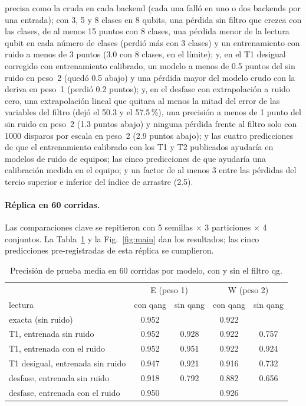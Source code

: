 \documentclass[11pt]{article}
\begin{document}
\begin{itemize}
  precisa como la cruda en cada backend (cada una falló en uno o dos backends por una entrada); con 3, 5 y 8 clases
  en 8 qubits, una pérdida sin filtro que crezca con las clases, de al menos 15 puntos con 8 clases, una pérdida
  menor de la lectura qubit en cada número de clases (perdió más con 3 clases) y un entrenamiento con ruido a menos
  de 3 puntos (3.0 con 8 clases, en el límite); y, en el T1 desigual corregido con entrenamiento calibrado, un modelo
  a menos de 0.5 puntos del sin ruido en peso~2 (quedó 0.5 abajo) y una pérdida mayor del modelo crudo con la deriva
  en peso~1 (perdió 0.2 puntos); y, en el desfase con extrapolación a ruido cero, una extrapolación lineal que quitara
  al menos la mitad del error de las variables del filtro (dejó el 50.3 y el 57.5\,\%), una precisión a menos de 1 punto
  del sin ruido en peso~2 (1.3 puntos abajo) y ninguna pérdida frente al filtro solo con 1000 disparos por escala en
  peso~2 (2.9 puntos abajo); y las cuatro predicciones de que el entrenamiento calibrado con los T1 y T2 publicados
  ayudaría en modelos de ruido de equipos; las cinco predicciones de que ayudaría una calibración medida en el equipo;
  y un factor de al menos 3 entre las pérdidas del tercio superior e inferior del índice de arrastre (2.5).
\end{itemize}

\paragraph{Réplica en 60 corridas.} Las comparaciones clave se repitieron con 5 semillas $\times$ 3 particiones
$\times$ 4 conjuntos. La Tabla~\ref{tab:main} y la Fig.~\ref{fig:main} dan los resultados; las cinco
predicciones pre-registradas de esta réplica se cumplieron.

\begin{table}[h]
\centering\small
\begin{tabular}{lcccc}
\toprule
 & \multicolumn{2}{c}{E (peso 1)} & \multicolumn{2}{c}{W (peso 2)}\\
lectura & con qang & sin qang & con qang & sin qang\\
\midrule
exacta (sin ruido) & 0.952 & & 0.922 & \\
T1, entrenada sin ruido & 0.952 & 0.928 & 0.922 & 0.757\\
T1, entrenada con el ruido & 0.952 & 0.951 & 0.922 & 0.924\\
T1 desigual, entrenada sin ruido & 0.947 & 0.921 & 0.916 & 0.732\\
desfase, entrenada sin ruido & 0.918 & 0.792 & 0.882 & 0.656\\
desfase, entrenada con el ruido & 0.950 & & 0.926 & \\
\bottomrule
\end{tabular}
\caption{Precisión de prueba media en 60 corridas por modelo, con y sin el filtro qg.}
\label{tab:main}
\end{table}
\end{document}
